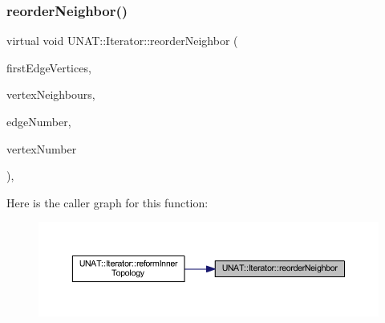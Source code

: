 \mbox{\label{classUNAT_1_1Iterator_ac54a79d677f7452d03a02fea6fb435f3}} 
\subsubsection{\texorpdfstring{reorderNeighbor()}{reorderNeighbor()}\hspace{0.1cm}{\footnotesize\ttfamily [2/2]}}
{\footnotesize\ttfamily virtual void U\+N\+A\+T\+::\+Iterator\+::reorder\+Neighbor (\begin{DoxyParamCaption}\item[{\mbox{\hyperlink{include_2swMacro_8h_a113cf5f6b5377cdf3fac6aa4e443e9aa}{sw\+Int}} $\ast$}]{first\+Edge\+Vertices,  }\item[{\mbox{\hyperlink{include_2swMacro_8h_a113cf5f6b5377cdf3fac6aa4e443e9aa}{sw\+Int}} $\ast$}]{vertex\+Neighbours,  }\item[{\mbox{\hyperlink{include_2swMacro_8h_a113cf5f6b5377cdf3fac6aa4e443e9aa}{sw\+Int}}}]{edge\+Number,  }\item[{\mbox{\hyperlink{include_2swMacro_8h_a113cf5f6b5377cdf3fac6aa4e443e9aa}{sw\+Int}}}]{vertex\+Number }\end{DoxyParamCaption})\hspace{0.3cm}{\ttfamily [inline]}, {\ttfamily [virtual]}}

Here is the caller graph for this function\+:
\nopagebreak
\begin{figure}[H]
\begin{center}
\leavevmode
\includegraphics[width=350pt]{classUNAT_1_1Iterator_ac54a79d677f7452d03a02fea6fb435f3_icgraph}
\end{center}
\end{figure}
\mbox{\label{classUNAT_1_1Iterator_a45d6064d872b297ff6b69f86bc7c54df}} 
